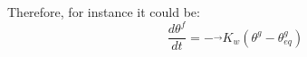 Therefore, for instance it could be:
\begin{equation}
\frac{d \theta^f}{dt} = - \vec{} K_w ({\theta^g - \theta^g_{eq}})
\end{equation}